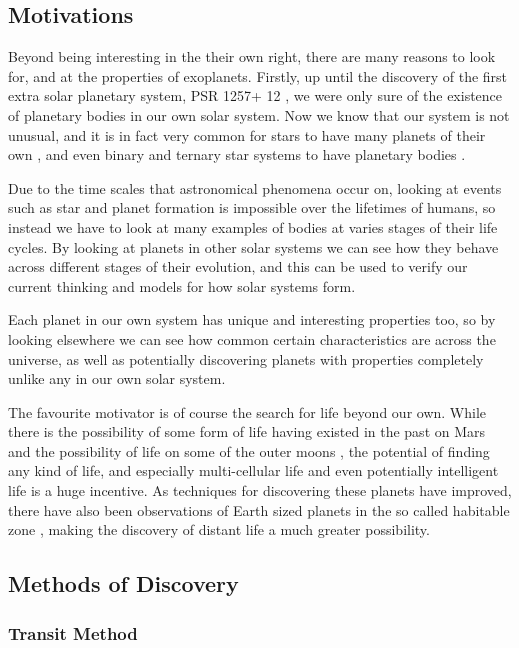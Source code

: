 \subsection{Motivations}

Beyond being interesting in the their own right, there are many reasons to look for, and at the properties of exoplanets. Firstly, up until the discovery of the first extra solar planetary system, PSR 1257+ 12 \cite{wolszczan1992planetary}, we were only sure of the existence of planetary bodies in our own solar system. Now we know that our system is not unusual, and it is in fact very common for stars to have many planets of their own \cite{mcarthur2004detection}, and even binary and ternary star systems to have planetary bodies \cite{marcy2002planet}.

Due to the time scales that astronomical phenomena occur on, looking at events such as star and planet formation is impossible over the lifetimes of humans, so instead we have to look at many examples of bodies at varies stages of their life cycles. By looking at planets in other solar systems we can see how they behave across different stages of their evolution, and this can be used to verify our current thinking and models for how solar systems form.

Each planet in our own system has unique and interesting properties too, so by looking elsewhere we can see how common certain characteristics are across the universe, as well as potentially discovering planets with properties completely unlike any in our own solar system.

The favourite motivator is of course the search for life beyond our own. While there is the possibility of some form of life having existed in the past on Mars \cite{mckay1996search} and the possibility of life on some of the outer moons \cite{mckay2005possibilities}, the potential of finding any kind of life, and especially multi-cellular life and even potentially intelligent life is a huge incentive. As techniques for discovering these planets have improved, there have also been observations of Earth sized planets in the so called habitable zone \cite{wordsworth2011gliese}, making the discovery of distant life a much greater possibility.

\subsection{Methods of Discovery}

\subsubsection{Transit Method}

